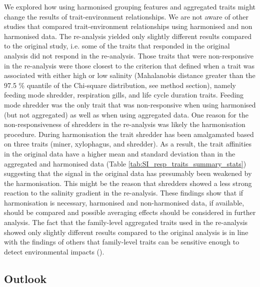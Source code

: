 \documentclass{article}
\begin{document}
We explored how using harmonised grouping features and aggregated traits might change the results of trait-environment relationships. We are not aware of other studies that compared trait-environment relationships using harmonised and non harmonised data. The re-analysis yielded only slightly different results compared to the original study, i.e. some of the traits that responded in the original analysis did not respond in the re-analysis. Those traits that were non-responsive in the re-analysis were those closest to the criterion that defined when a trait was associated with either high or low salinity (Mahalanobis distance greater than the 97.5 \% quantile of the Chi-square distribution, see method section), namely feeding mode shredder, respiration gills, and life cycle duration traits. Feeding mode shredder was the only trait that was non-responsive when using harmonised (but not aggregated) as well as when using aggregated data. One reason for the non-responsiveness of shredders in the re-analysis was likely the harmonisation procedure. During harmonisation the trait shredder has been amalgamated based on three traits (miner, xylophagus, and shredder). As a result, the trait affinities in the original data have a higher mean and standard deviation than in the aggregated and harmonised data (Table \ref{tab:SI_resp_traits_summary_stats}) suggesting that the signal in the original data has presumably been weakened by the harmonisation. This might be the reason that shredders showed a less strong reaction to the salinity gradient in the re-analysis. These findings show that if harmonisation is necessary, harmonised and non-harmonised data, if available, should be compared and possible averaging effects should be considered in further analysis. The fact that the family-level aggregated traits used in the re-analysis showed only slightly different results compared to the original analysis is in line with the findings of others that family-level traits can be sensitive enough to detect environmental impacts (\cite{beketov_spear_2009}). 


\subsection*{Outlook}
\end{document}
